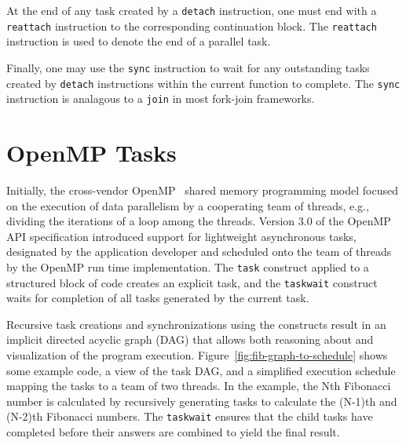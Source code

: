 \documentclass[sigconf]{acmart}
\newcommand{\figref}[1]         {Figure~\ref{fig:#1}}
\def\code{\lstinline[basicstyle=\ttfamily\color{CodeColor}]}
\begin{document}
At the end of any task created by a \code{detach} instruction, one must end with a \code{reattach} instruction to the corresponding continuation block. The \code{reattach} instruction
is used to denote the end of a parallel task.

Finally, one may use the \code{sync} instruction to wait for any outstanding tasks created
by \code{detach} instructions within the current function to complete. The \code{sync}
instruction is analagous to a \code{join} in most fork-join frameworks.


\section{OpenMP Tasks} \label{Sec:OpenMP}

Initially, the cross-vendor OpenMP~\cite{spec} shared memory programming model 
focused on the execution of data parallelism by a cooperating team of threads, 
e.g., dividing the iterations of a loop among the threads. Version 3.0 of the 
OpenMP API specification introduced support for lightweight asynchronous tasks, 
designated by the application developer and scheduled onto the team of threads 
by the OpenMP run time implementation.  The \texttt{task} construct applied to 
a structured block of code creates an explicit task, and the \texttt{taskwait} 
construct waits for completion of all tasks generated by the current task.

Recursive task creations and synchronizations using the constructs result in 
an implicit directed acyclic graph (DAG) that allows both reasoning about and 
visualization of the program execution.  \figref{fib-graph-to-schedule}
shows some example code, a view of the task DAG, and a simplified execution 
schedule mapping the tasks to a team of two threads.  In the example, the Nth 
Fibonacci number is calculated by recursively generating tasks to calculate 
the (N-1)th and (N-2)th Fibonacci numbers.  The \texttt{taskwait} ensures that 
the child tasks have completed before their answers are combined to yield the 
final result.
\end{document}

